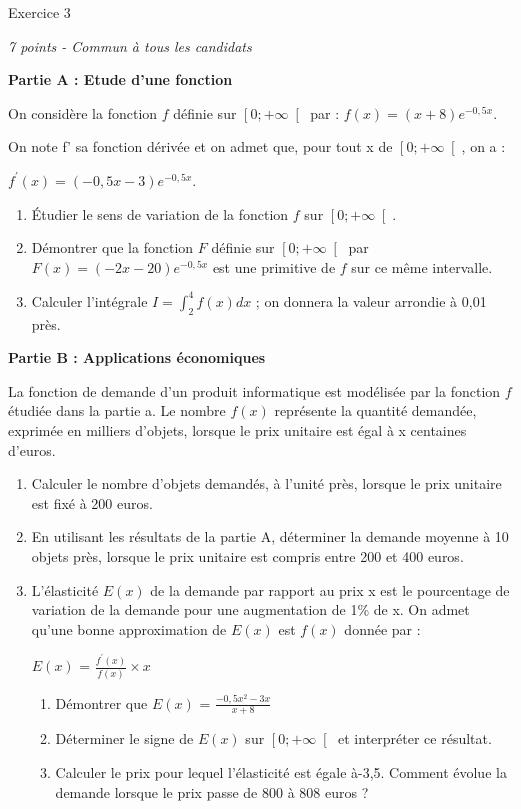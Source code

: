 
%
\begin{h2}Exercice 3\end{h2}
\textit{7 points - Commun à tous les candidats}
\par
\textbf{Partie A : Etude d'une fonction}
\par
On considère la fonction $f$ définie sur $\left[0 ;+\infty \right[$ par : $f\left(x\right)=\left(x+8\right) e^{-0,5x}$.
\par
On note f' sa fonction dérivée et on admet que, pour tout x de $\left[0 ;+\infty \right[$, on a :
\par
$f^{\prime}\left(x\right)=\left(-0,5x-3\right)e^{-0,5x}$.
\begin{enumerate}
     \item
     Étudier le sens de variation de la fonction $f$ sur $\left[0 ; +\infty \right[$.
     \item
     Démontrer que la fonction $F$ définie sur $\left[0 ;+\infty \right[$ par $F\left(x\right)=\left(-2x -20\right) e^{-0,5x}$ est une primitive de $f$ sur ce même intervalle.
     \item
     Calculer l'intégrale $I=\int_{2}^{4}f\left(x\right)dx$ ; on donnera la valeur arrondie à 0,01 près.
\end{enumerate}
\par
\textbf{Partie B : Applications économiques}
\par
La fonction de demande d'un produit informatique est modélisée par la fonction $f$ étudiée dans la partie a. Le nombre $f\left(x\right)$ représente la quantité demandée, exprimée en milliers d'objets, lorsque le prix unitaire est égal à x centaines d'euros.
\begin{enumerate}
     \item
     Calculer le nombre d'objets demandés, à l'unité près, lorsque le prix unitaire est fixé à 200 euros.
     \item
     En utilisant les résultats de la partie A, déterminer la demande moyenne à 10 objets près, lorsque le prix unitaire est compris entre 200 et 400 euros.
     \item
     L'élasticité $ E(x) $   de la demande par rapport au prix x est le pourcentage de variation de la demande pour une augmentation de 1\% de x. On admet qu'une bonne approximation de $ E(x) $  est $f\left(x\right)$ donnée par :
     \par
     $ E(x) $  = $\frac{f^{\prime}\left(x\right)}{f\left(x\right)}\times x$
     \begin{enumerate}[label=\alph*.]
          \item
          Démontrer que $ E(x) $  = $\frac{-0,5x^{2}-3x}{x+8}$
          \item
          Déterminer le signe de $ E(x) $  sur $\left[0 ; +\infty \right[$ et interpréter ce résultat.
          \item
          Calculer le prix pour lequel l'élasticité est égale à-3,5. Comment évolue la demande lorsque le prix passe de 800 à 808 euros ?
     \end{enumerate}
\end{enumerate}

